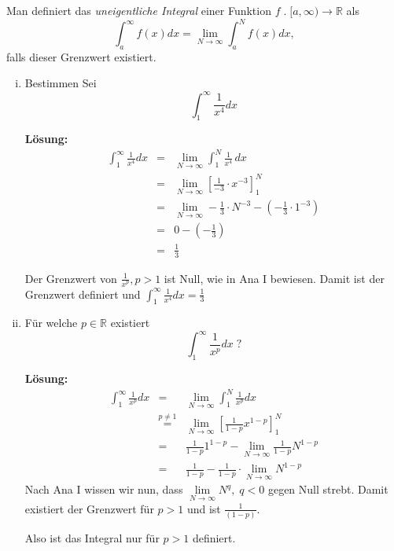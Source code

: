 \documentclass[11pt,a4paper,ngerman]{article}
\begin{document}
Man definiert das \emph{uneigentliche Integral} einer Funktion $f \; . \; [a,\infty) \rightarrow \mathbb{R}$ als
$$
\int_a^\infty f(x)dx = \lim_{N\rightarrow \infty} \int_a^N f(x)dx,
$$
falls dieser Grenzwert existiert.
\begin{enumerate}[(i)]
	\item Bestimmen Sei
		$$
			\int_1^\infty \frac{1}{x^4} dx
		$$
	
	\textbf{Lösung:}\\
	
	$$\begin{array}{rcl}
		\int_1^\infty \frac{1}{x^4} dx &=& \underset{{N\rightarrow \infty}}{\lim} \int_1^N \frac{1}{x^4} \, dx\\
			&=& \underset{{N\rightarrow \infty}}{\lim} \left[ \frac{1}{-3} \cdot x^{-3} \right]_1^N\\
			&=& \underset{{N\rightarrow \infty}}{\lim} - \frac{1}{3} \cdot N^{-3} - (-\frac{1}{3} \cdot 1^{-3})\\
			&=& 0 - (-\frac{1}{3})  \\
            &=& \frac{1}{3}
	\end{array}$$

	Der Grenzwert von $\frac{1}{x^p}, p>1$ ist Null, wie in Ana I bewiesen. Damit ist der Grenzwert definiert und $\int_1^\infty \frac{1}{x^4} dx = \frac{1}{3}$

	\item Für welche $p\in\mathbb{R}$ existiert
		$$
			\int_1^\infty \frac{1}{x^p}dx \; ?
		$$

	\textbf{Lösung:}\\
		$$\begin{array}{rcl}
			\int_1^\infty \frac{1}{x^p}dx &=& \underset{{N\rightarrow \infty}}{\lim} \int_1^N \frac{1}{x^p}dx\\
				&\stackrel{p\not=1}{=}& \underset{{N\rightarrow \infty}}{\lim} \left[ \frac{1}{1-p} x^{1-p}\right]_1^N\\
				&=& \frac{1}{1-p} 1^{1-p} -\underset{{N\rightarrow \infty}}{\lim} \frac{1}{1-p} N^{1-p}\\
                &=& \frac{1}{1-p} - \frac{1}{1-p} \cdot \underset{{N\rightarrow \infty}}{\lim} N^{1-p}
		\end{array}$$
		Nach Ana I wissen wir nun, dass $\underset{{N\rightarrow \infty}}{\lim} N^q, \; q < 0$ gegen Null strebt. Damit existiert der Grenzwert für $p > 1$ und ist $\frac{1}{(1-p)}$. 

		Also ist das Integral nur für $p > 1$ definiert.
\end{enumerate}
\end{document}
